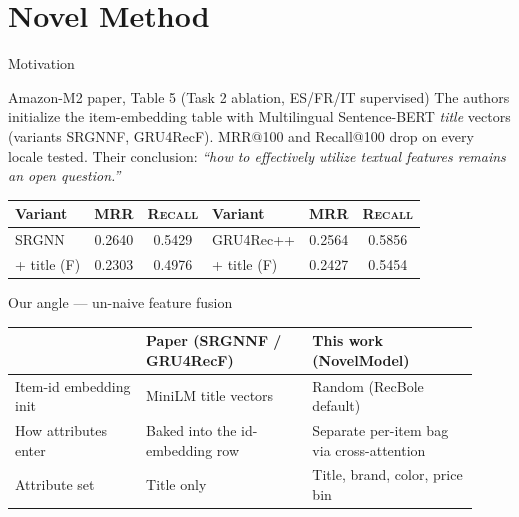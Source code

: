 \documentclass[10pt,aspectratio=169]{beamer}
\newcommand{\metric}[1]{\textsc{#1}}
\begin{document}
\section{Novel Method}

\begin{frame}{Motivation}
  \begin{block}{Amazon-M2 paper, Table 5 (Task 2 ablation, ES/FR/IT supervised)}
    The authors initialize the item-embedding table with Multilingual Sentence-BERT \emph{title} vectors (variants SRGNNF, GRU4RecF). MRR@100 and Recall@100 drop on every locale tested. Their conclusion: \textit{``how to effectively utilize textual features remains an open question.''}

    \vspace{0.2em}
    \begin{center}
    \scriptsize
    \begin{tabular}{lcc@{\hskip 1.5em}lcc}
      \toprule
      Variant & \metric{MRR} & \metric{Recall} & Variant & \metric{MRR} & \metric{Recall} \\
      \midrule
      SRGNN              & 0.2640 & 0.5429 & GRU4Rec++         & 0.2564 & 0.5856 \\
      \quad + title (F)  & 0.2303 & 0.4976 & \quad + title (F) & 0.2427 & 0.5454 \\
      \bottomrule
    \end{tabular}
    \end{center}
  \end{block}

  \vspace{0.3em}
  \begin{alertblock}{Our angle --- un-naive feature fusion}
    \scriptsize
    \begin{tabular}{@{}p{0.26\linewidth}p{0.33\linewidth}p{0.33\linewidth}@{}}
      \toprule
                              & Paper (SRGNNF / GRU4RecF)        & This work (NovelModel) \\
      \midrule
      Item-id embedding init  & MiniLM title vectors             & Random (RecBole default) \\
      How attributes enter    & Baked into the id-embedding row  & Separate per-item bag via cross-attention \\
      Attribute set           & Title only                       & Title, brand, color, price bin \\
      \bottomrule
    \end{tabular}
  \end{alertblock}
\end{frame}
\end{document}
